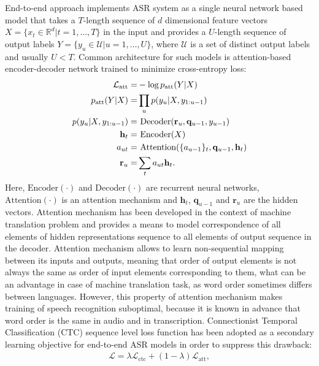 \documentclass[12pt,a4paper]{article}
\begin{document}
End-to-end approach implements ASR system as
a single neural network based model that takes a $T$-length sequence of
$d$ dimensional feature vectors $X = \{ x_t \in \mathbb{R}^d | t = 1, \dots, T \}$ in the input
and provides a $U$-length sequence
of output labels $Y = \{ y_u \in \mathcal{U} | u = 1, \dots, U \}$,
where $\mathcal{U}$ is a set of distinct output labels
and usually $U < T$.
Common architecture for such models is attention-based encoder-decoder network
trained to minimize cross-entropy loss:
\begin{align}
\mathcal{L}_{\text{att}} = & - \log \mathnormal{p}_{\text{att}}(Y|X) \\
\mathnormal{p}_{\text{att}}(Y|X)  = & \prod_u \mathnormal{p}(y_u | X, y_{1:u-1}) \\
\mathnormal{p}(y_u | X, y_{1:u-1}) = & \text{ Decoder} (\mathbf{r}_{u}, \mathbf{q}_{u-1}, y_{u-1}) \\
\mathbf{h}_t = & \text{ Encoder}(X) \\
a_{ut} = & \text{ Attention}(\{a_{u-1}\}_t, \mathbf{q}_{u-1}, \mathbf{h}_t) \\
\mathbf{r}_u = & \sum_t a_{ut} \mathbf{h}_{t}.
\end{align}
Here, $\text{Encoder}(\cdot)$ and $\text{Decoder}(\cdot)$ are
recurrent neural  networks, $\text{Attention}(\cdot)$
is an attention mechanism and
$\mathbf{h}_t$, $\mathbf{q}_{u-1}$ and $\mathbf{r}_u$
are the hidden vectors.
Attention mechanism has been developed in the context of machine translation
problem \cite{bahdanau2014neural} and provides a means to model correspondence of all elements
of hidden representations sequence to all elements of output sequence
in the decoder. Attention mechanism allows to learn non-sequential
mapping between its inputs and outputs, meaning that
order of output elements is not always the same as order
of input elements corresponding to them,
what can be an advantage in case of machine translation task,
as word order sometimes differs between languages.
However, this property of attention mechanism makes training
of speech recognition suboptimal, because it is known in advance
that word order is the same in audio and in transcription.
Connectionist Temporal Classification (CTC) sequence level loss function \cite{graves2006connectionist} has been adopted as a secondary learning
objective for end-to-end ASR models in order to suppress this drawback:
\begin{align}
\mathcal{L} = \lambda \mathcal{L}_{\text{ctc}} + (1-\lambda) \mathcal{L}_{\text{att}},
\end{align}
\end{document}
